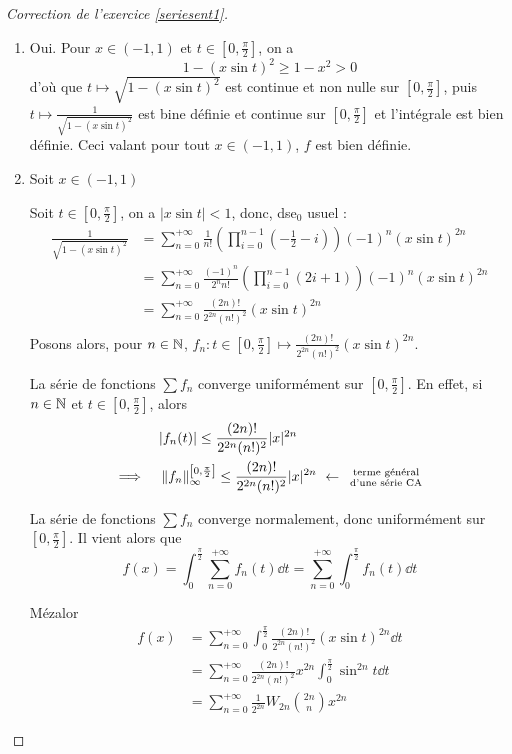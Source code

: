 \begin{proof}[Correction de l'exercice \ref{seriesent1}]
	\begin{enumerate}
		\item Oui. Pour $x\in(-1,1)$ et $t\in\left[0,\frac\pi2\right]$, on a \[1-(x\sin t)^2\geq 1-x^2> 0\]
		d'où que $t\mapsto \sqrt{1-(x\sin t)^2}$ est continue et non nulle sur $\left[0,\frac\pi2\right]$, puis $t\mapsto \frac1{\sqrt{1-(x\sin t)^2}}$ est bine définie et continue sur $\left[0,\frac\pi2\right]$ et l'intégrale est bien définie. Ceci valant pour tout $x\in(-1,1)$, $f$ est bien définie.
		\item Soit $x\in(-1,1)$


		Soit $t\in\left[0,\frac\pi2\right]$, on a $|x\sin t| < 1$, donc, dse${}_0$ usuel : 
		\begin{align*}
			\frac1{\sqrt{1-(x\sin t)^2}} &= \sum_{n=0}^{+\infty}\frac1{n!}\left(\prod_{i=0}^{n-1}\left(-\frac12-i\right)\right)(-1)^n(x\sin t)^{2n}\\
										 &= \sum_{n=0}^{+\infty}\frac{(-1)^n}{2^nn!}\left(\prod_{i=0}^{n-1}(2i+1)\right)(-1)^n(x\sin t)^{2n}\\
										 &= \sum_{n=0}^{+\infty}\frac{(2n)!}{2^{2n}(n!)^2}(x\sin t)^{2n}\\
		\end{align*}
		Posons alors, pour $n\in\operatorname{\mathbb N}$, $f_n:t\in\left[0,\frac\pi2\right]\mapsto\frac{(2n)!}{2^{2n}(n!)^2}(x\sin t)^{2n}$.


		La série de fonctions $\displaystyle\sum f_n$ converge uniformément sur $\left[0,\frac\pi2\right]$. En effet, si $n\in\operatorname{\mathbb N}$ et $t\in\left[0,\frac\pi2\right]$, alors 
		\begin{align*}
			& \quad |f_n(t)|\leq \frac{(2n)!}{2^{2n}(n!)^2}|x|^{2n}\\
			\implies & \quad  \norm{f_n}_\infty^{\left[0,\frac\pi2\right]} \leq \frac{(2n)!}{2^{2n}(n!)^2}|x|^{2n} \ \leftarrow \ \begin{smallmatrix}\text{terme général}\\ \text{d'une série CA}\end{smallmatrix}
		\end{align*}

		La série de fonctions $\displaystyle\sum f_n$ converge normalement, donc uniformément sur $\left[0,\frac\pi2\right]$. Il vient alors que 
		\[f(x)=\int_0^\frac\pi2\sum_{n=0}^{+\infty}f_n(t)\dd t = \sum_{n=0}^{+\infty}\int_0^\frac\pi2 f_n(t)\dd t \]

		Mézalor 
		\begin{align*}
			f(x) &= \sum_{n=0}^{+\infty}\int_0^\frac\pi2\frac{(2n)!}{2^{2n}(n!)^2}(x\sin t)^{2n}\dd t\\
				 &= \sum_{n=0}^{+\infty}\frac{(2n)!}{2^{2n}(n!)^2}x^{2n}\int_0^\frac\pi2\sin^{2n} t\dd t\\
				 &= \sum_{n=0}^{+\infty}\frac1{2^{2n}}W_{2n}\binom{2n}nx^{2n}
		\end{align*}


\end{enumerate}
\end{proof}
